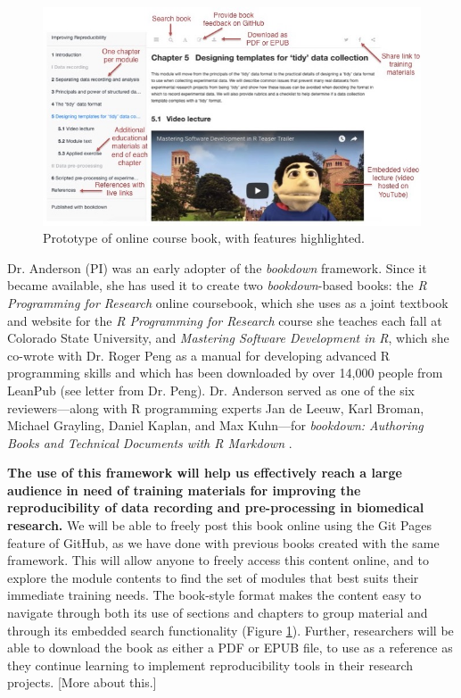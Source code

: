 \documentclass[pdftex,english,11pt,parskip=half]{scrartcl}
\begin{document}
\begin{figure}[t] \includegraphics[width =
\textwidth]{figures/book_prototype.jpg} \caption{Prototype of online course
book, with features highlighted.} \label{fig:prototype} \end{figure}

Dr. Anderson (PI) was an early adopter of the \textit{bookdown} framework. Since
it became available, she has used it to create two \textit{bookdown}-based
books: the \textit{R Programming for Research} online coursebook, which she uses
as a joint textbook and website for the \textit{R Programming for Research}
course she teaches each fall at Colorado State University, and \textit{Mastering
Software Development in R}, which she co-wrote with Dr. Roger Peng as a manual
for developing advanced R programming skills and which has been downloaded by
over 14,000 people from LeanPub (see letter from Dr. Peng). Dr. Anderson served as one of the six
reviewers---along with R programming experts Jan de Leeuw, Karl Broman, Michael
Grayling, Daniel Kaplan, and Max Kuhn---for \textit{bookdown: Authoring Books
and Technical Documents with R Markdown} \cite{xie2016bookdown}.

\textbf{The use of this framework will help us effectively reach a large
audience in need of training materials for improving the reproducibility of data
recording and pre-processing in biomedical research.} We will be able to freely
post this book online using the Git Pages feature of GitHub, as we have done
with previous books created with the same framework. This will allow anyone to
freely access this content online, and to explore the module contents to find
the set of modules that best suits their immediate training needs. The
book-style format makes the content easy to navigate through both its use of
sections and chapters to group material and through its embedded search
functionality (Figure \ref{fig:prototype}). Further, researchers will be able to
download the book as either a PDF or EPUB file, to use as a reference as they
continue learning to implement reproducibility tools in their research projects.
[More about this.]
\end{document}
